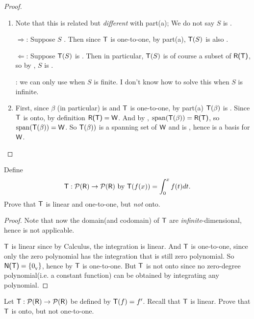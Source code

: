 \begin{proof}
\begin{enumerate}
\item Note that this is related but \emph{different} with part(a);
    We do not say \(S\) is \LID{}.

\(\Longrightarrow\): Suppose \(S\) \LID{}.
    Then since \(\textsf{T}\) is one-to-one, by part(a), \(\textsf{T}(S)\) is also \LID{}.

\(\Longleftarrow\): Suppose \(\textsf{T}(S)\) is \LID{}.
    Then in particular, \(\textsf{T}(S)\) is of course a subset of \(\textsf{R(T)}\), so by , \(S\) is \LID{}.
    
    : we can only use  when \(S\) is finite.
    I don't know how to solve this when \(S\) is infinite.

\item First, since \(\beta\) (in particular) is \LID{} and \(\textsf{T}\) is one-to-one, by part(a) \(\textsf{T}(\beta)\) is \LID{}.
Since \(\textsf{T}\) is onto, by definition \(\textsf{R(T)} = \textsf{W}\).
And by , \(\operatorname{span}(\textsf{T}(\beta)) = \textsf{R(T)}\), so \(\operatorname{span}(\textsf{T}(\beta)) = \textsf{W}\).
So \(\textsf{T}(\beta))\) is a spanning set of \(\textsf{W}\) and is \LID{}, hence is a basis for \(\textsf{W}\).
\end{enumerate}
\end{proof}

\begin{exercise} \label{exercise 2.1.15}
Define
\[
    \textsf{T} : \mathcal{P}(\textsf{R}) \to \mathcal{P}(\textsf{R}) \text{ by } \textsf{T}(f(x)) = \int_0^x f(t) dt.
\]
Prove that \(\textsf{T}\) is linear and one-to-one, but \emph{not} onto.
\end{exercise}

\begin{proof}
Note that now the domain(and codomain) of \(\textsf{T}\) are \emph{infinite}-dimensional, hence  is not applicable.

\(\textsf{T}\) is linear since by Calculus, the integration is linear.
And \(\textsf{T}\) is one-to-one, since only the zero polynomial has the integration that is still zero polynomial.
So \(\textsf{N(T)} = \{ 0_{_{\textsf{V}}} \}\), hence by  \(\textsf{T}\) is one-to-one.
But \(\textsf{T}\) is not onto since no zero-degree polynomial(i.e. a constant function) can be obtained by integrating any polynomial.
\end{proof}

\begin{exercise} \label{exercise 2.1.16}
Let \(\textsf{T} : \mathcal{P}(\textsf{R}) \to \mathcal{P}(\textsf{R})\) be defined by \(\textsf{T}(f) = f'\).
Recall that \(\textsf{T}\) is linear.
Prove that \(\textsf{T}\) is onto, but not one-to-one.
\end{exercise}

